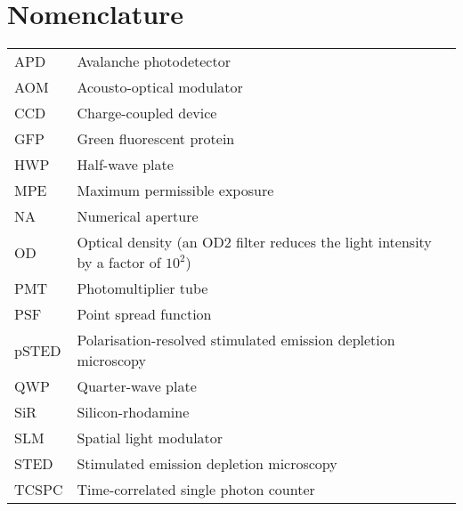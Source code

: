 \chapter{Nomenclature}

\begin{tabular}{ll}
	APD   & Avalanche photodetector                                                              \\
	AOM   & Acousto-optical modulator                             \\
	CCD & Charge-coupled device                               \\
	GFP   & Green fluorescent protein                                                            \\
	HWP   & Half-wave plate                                                                      \\
	MPE   & Maximum permissible exposure                             \\
	NA & Numerical aperture                            \\
	OD    & Optical density  (an OD2 filter reduces the light intensity by a factor of $ 10^2 $) \\
	PMT   & Photomultiplier tube                                                                 \\
	PSF   & Point spread function                                                                \\
	pSTED & Polarisation-resolved stimulated emission depletion microscopy                       \\
	QWP   & Quarter-wave plate                                                                   \\
	SiR   & Silicon-rhodamine                                                                    \\
	SLM   & Spatial light modulator                                                              \\
	STED  & Stimulated emission depletion  microscopy                                            \\
	TCSPC & Time-correlated single photon counter
\end{tabular}